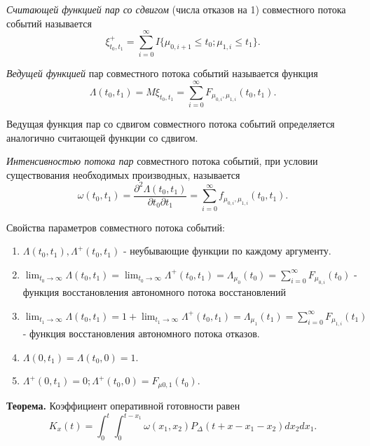 \textit{Считающей функцией пар со сдвигом} (числа отказов на 1) совместного потока событий называется
\begin{equation}
\xi_{t_0,t_1} ^+= \sum_{i=0}^\infty I\{\mu_{0,i+1} \leqslant t_0; \mu_{1,i} \leqslant t_1\}.
\end{equation}

\textit{Ведущей функцией} пар совместного потока событий называется функция
\begin{equation}
\Lambda(t_0,t_1) = M\xi_{t_0,t_1} = \sum_{i=0}^\infty F_{\mu_{0,i}, \mu_{1,i}}(t_0,t_1).
\end{equation}

Ведущая функция пар со сдвигом совместного потока событий определяется аналогично считающей функции со сдвигом.

\textit{Интенсивностью потока пар} совместного потока событий, при условии существования необходимых производных, называется
 \begin{equation}
\omega(t_0, t_1) = \frac{\partial^2\Lambda(t_0, t_1)}{\partial t_0 \partial t_1} = \sum_{i=0}^\infty f_{\mu_{0,i}, \mu_{1,i}}(t_0, t_1).
\end{equation}

Свойства параметров совместного потока событий:
\begin{enumerate}
\item $ \Lambda(t_0, t_1),  \Lambda^+(t_0, t_1)$ - неубывающие функции по каждому аргументу.

\item $\lim_{t_0 \to \infty} \Lambda(t_0, t_1) = \lim_{t_0 \to \infty} \Lambda^+(t_0, t_1) = \Lambda_{\mu_0}(t_0) = \sum_{i=0}^\infty F_{\mu_{0,i}}(t_0)$ - функция восстановления автономного потока восстановлений

\item $\lim_{t_1 \to \infty} \Lambda(t_0, t_1) = 1 + \lim_{t_1 \to \infty} \Lambda^+(t_0, t_1) = \Lambda_{\mu_1}(t_1) = \sum_{i=0}^\infty F_{\mu_{1,i}}(t_1)$ - функция восстановления автономного потока отказов.

\item $\Lambda(0, t_1) = \Lambda(t_0, 0) = 1.$

\item $\Lambda^+(0, t_1)  = 0; \Lambda^+(t_0, 0) = F_{\mu{0,1}}(t_0).$

\end{enumerate}

{\bfseries Теорема.} Коэффициент оперативной готовности равен
 \begin{equation}
K_x(t) = \int_0^t \int_0^{t - x_1} \omega(x_1, x_2) P_\Delta(t + x - x_1 - x_2) d x_2 d x_1.
\end{equation}

